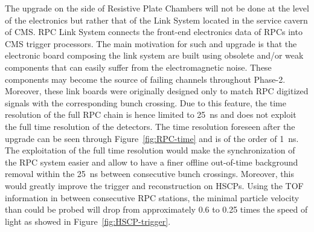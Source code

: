 	The upgrade on the side of Resistive Plate Chambers will not be done at the level of the electronics but rather that of the Link System located in the service cavern of CMS. RPC Link System connects the front-end electronics data of RPCs into CMS trigger processors. The main motivation for such and upgrade is that the electronic board composing the link system are built using obsolete and/or weak components that can easily suffer from the electromagnetic noise. These components may become the source of failing channels throughout Phase-2. Moreover, these link boards were originally designed only to match RPC digitized signals with the corresponding bunch crossing. Due to this feature, the time resolution of the full RPC chain is hence limited to \SI{25}{ns} and does not exploit the full time resolution of the detectors. The time resolution foreseen after the upgrade can be seen through Figure~\ref{fig:RPC-time} and is of the order of \SI{1}{ns}. The exploitation of the full time resolution would make the synchronization of the RPC system easier and allow to have a finer offline out-of-time background removal within the \SI{25}{ns} between consecutive bunch crossings. Moreover, this would greatly improve the trigger and reconstruction on HSCPs. Using the TOF information in between consecutive RPC stations, the minimal particle velocity than could be probed will drop from approximately 0.6 to 0.25 times the speed of light as showed in Figure~\ref{fig:HSCP-trigger}.
	
\endgroup
	
